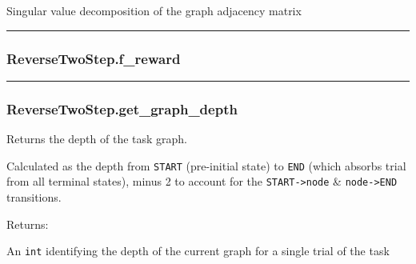 \begin{Shaded}
\begin{Highlighting}[]
\NormalTok{)}
\end{Highlighting}
\end{Shaded}

Singular value decomposition of the graph adjacency matrix

\begin{center}\rule{0.5\linewidth}{\linethickness}\end{center}

\subsubsection{ReverseTwoStep.f\_reward}\label{reversetwostep.f_reward}

\begin{Shaded}
\begin{Highlighting}[]
\end{Highlighting}
\end{Shaded}

\begin{center}\rule{0.5\linewidth}{\linethickness}\end{center}

\subsubsection{ReverseTwoStep.get\_graph\_depth}\label{reversetwostep.get_graph_depth}

\begin{Shaded}
\begin{Highlighting}[]
\NormalTok{)}
\end{Highlighting}
\end{Shaded}

Returns the depth of the task graph.

Calculated as the depth from \texttt{START} (pre-initial state) to
\texttt{END} (which absorbs trial from all terminal states), minus 2 to
account for the \texttt{START-\textgreater{}node} \&
\texttt{node-\textgreater{}END} transitions.

Returns:

An \texttt{int} identifying the depth of the current graph for a single
trial of the task

